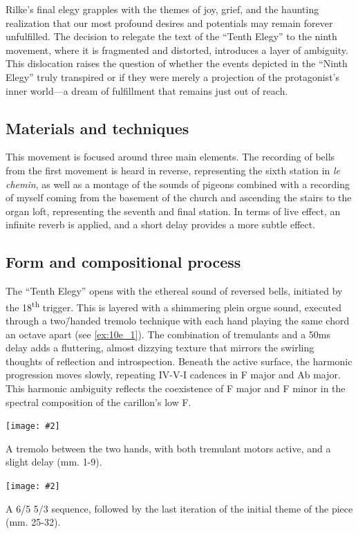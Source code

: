 \documentclass[12pt,twoside,maitrise]{dms_ks}
\newcommand{\customincludeexamples}[4][]{%
    \begin{example}[H]
        \centering
        \texttt{[image: \#2]}
        \caption{#4}
	\label{#3} 
    \end{example}
}
\theoremstyle{definition}
\begin{document}
{Rilke’s final elegy grapples with the themes of joy, grief, and the haunting realization that our most profound desires and potentials may remain forever unfulfilled. 
The decision to relegate the text of the “Tenth Elegy” to the ninth movement, where it is fragmented and distorted, introduces a layer of ambiguity. 
This dislocation raises the question of whether the events depicted in the “Ninth Elegy” truly transpired or if they were merely a projection of the protagonist's inner world---a dream of fulfillment that remains just out of reach.

\subsection{Materials and techniques}

This movement is focused around three main elements.
The recording of bells from the first movement is heard in reverse, representing the sixth station in \textit{le chemin}, as well as a montage of the sounds of pigeons combined with a recording of myself coming from the basement of the church and ascending the stairs to the organ loft, representing the seventh  and final station. 
In terms of live effect, an infinite reverb is applied, and a short delay provides a more subtle effect.

\subsection{Form and compositional process}

The “Tenth Elegy” opens with the ethereal sound of reversed bells, initiated by the 18\textsuperscript{th} trigger. 
This is layered with a shimmering plein orgue sound, executed through a two\=/handed tremolo technique with each hand playing the same chord an octave apart (see \cref{ex:10e_1}). 
The combination of tremulants and a 50ms delay adds a fluttering, almost dizzying texture that mirrors the swirling thoughts of reflection and introspection. 
Beneath the active surface, the harmonic progression moves slowly, repeating IV-V-I cadences in F major and Ab major. 
This harmonic ambiguity reflects the coexistence of F major and F minor in the spectral composition of the carillon's low F.

\customincludeexamples[width=\textwidth]{10e_1}{ex:10e_1}{A tremolo between the two hands, with both tremulant motors active, and a slight delay (mm. 1-9).}

\customincludeexamples[width=\textwidth]{10e_2}{ex:10e_2}{A 6/5 5/3 sequence, followed by the last iteration of the initial theme of the piece (mm. 25-32).}

}
\end{document}
